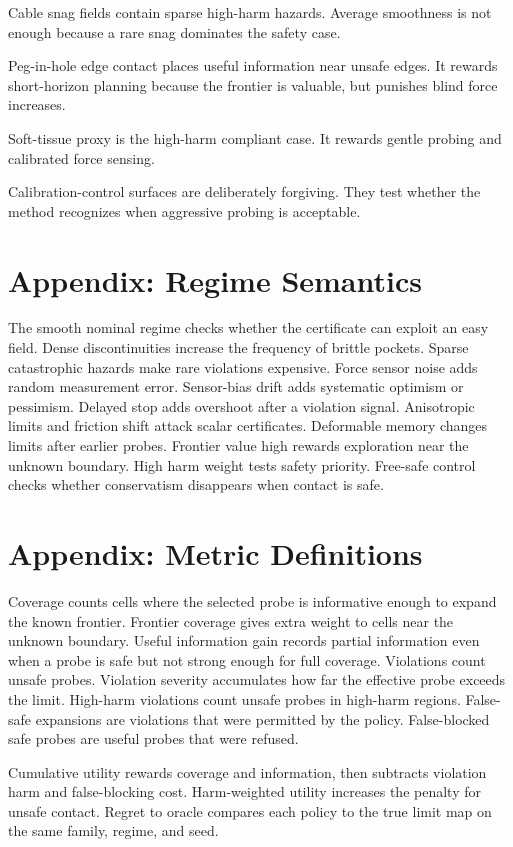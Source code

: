 \documentclass{article}
\begin{document}
Cable snag fields contain sparse high-harm hazards. Average smoothness is not
enough because a rare snag dominates the safety case.

Peg-in-hole edge contact places useful information near unsafe edges. It
rewards short-horizon planning because the frontier is valuable, but punishes
blind force increases.

Soft-tissue proxy is the high-harm compliant case. It rewards gentle probing
and calibrated force sensing.

Calibration-control surfaces are deliberately forgiving. They test whether the
method recognizes when aggressive probing is acceptable.

\section{Appendix: Regime Semantics}

The smooth nominal regime checks whether the certificate can exploit an easy
field. Dense discontinuities increase the frequency of brittle pockets.
Sparse catastrophic hazards make rare violations expensive. Force sensor noise
adds random measurement error. Sensor-bias drift adds systematic optimism or
pessimism. Delayed stop adds overshoot after a violation signal. Anisotropic
limits and friction shift attack scalar certificates. Deformable memory changes
limits after earlier probes. Frontier value high rewards exploration near the
unknown boundary. High harm weight tests safety priority. Free-safe control
checks whether conservatism disappears when contact is safe.

\section{Appendix: Metric Definitions}

Coverage counts cells where the selected probe is informative enough to expand
the known frontier. Frontier coverage gives extra weight to cells near the
unknown boundary. Useful information gain records partial information even when
a probe is safe but not strong enough for full coverage. Violations count
unsafe probes. Violation severity accumulates how far the effective probe
exceeds the limit. High-harm violations count unsafe probes in high-harm
regions. False-safe expansions are violations that were permitted by the
policy. False-blocked safe probes are useful probes that were refused.

Cumulative utility rewards coverage and information, then subtracts violation
harm and false-blocking cost. Harm-weighted utility increases the penalty for
unsafe contact. Regret to oracle compares each policy to the true limit map on
the same family, regime, and seed.
\end{document}
